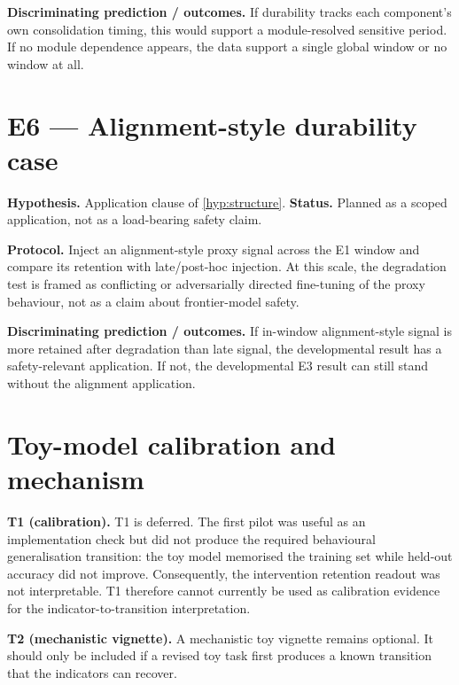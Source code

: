 \noindent\textbf{Discriminating prediction / outcomes.} If durability tracks each component's own
consolidation timing, this would support a module-resolved sensitive period. If no module dependence
appears, the data support a single global window or no window at all.


\section{E6 --- Alignment-style durability case}
\label{sec:res-e6}

\noindent\textbf{Hypothesis.} Application clause of \cref{hyp:structure}. \quad\textbf{Status.}
Planned as a scoped application, not as a load-bearing safety claim.

\noindent\textbf{Protocol.} Inject an alignment-style proxy signal across the E1 window and compare
its retention with late/post-hoc injection. At this scale, the degradation test is framed as
conflicting or adversarially directed fine-tuning of the proxy behaviour, not as a claim about
frontier-model safety.

\noindent\textbf{Discriminating prediction / outcomes.} If in-window alignment-style signal is more
retained after degradation than late signal, the developmental result has a safety-relevant
application. If not, the developmental E3 result can still stand without the alignment application.


\section{Toy-model calibration and mechanism}
\label{sec:res-toy}

\noindent\textbf{T1 (calibration).} T1 is deferred. The first pilot was useful as an implementation
check but did not produce the required behavioural generalisation transition: the toy model
memorised the training set while held-out accuracy did not improve. Consequently, the intervention
retention readout was not interpretable. T1 therefore cannot currently be used as calibration
evidence for the indicator-to-transition interpretation.

\noindent\textbf{T2 (mechanistic vignette).} A mechanistic toy vignette remains optional. It should
only be included if a revised toy task first produces a known transition that the indicators can
recover.

